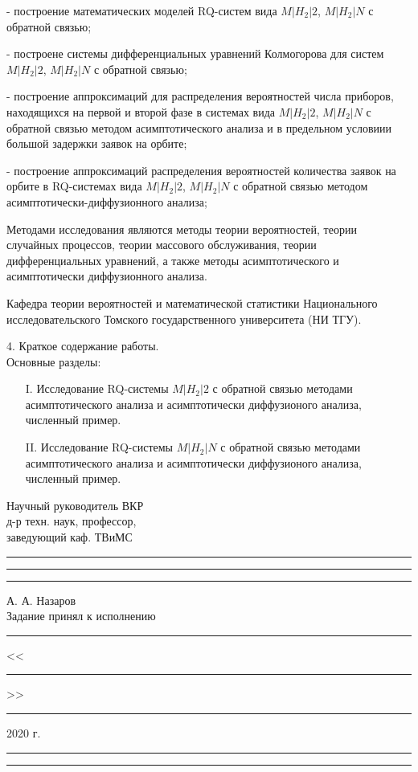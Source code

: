 - построение математических моделей RQ-систем вида $M|H_2|2$, $M|H_2|N$ с обратной связью;

- построене системы дифференциальных уравнений Колмогорова для систем $M|H_2|2$, $M|H_2|N$ с обратной связью;

- построение аппроксимаций для распределения вероятностей числа приборов, находящихся на первой и второй фазе в системах вида $M|H_2|2$, $M|H_2|N$ с обратной связью методом асимптотического анализа и в предельном условиии большой задержки заявок на орбите;

- построение аппроксимаций распределения вероятностей количества заявок на орбите в RQ-системах вида $M|H_2|2$, $M|H_2|N$ с обратной связью методом асимптотически-диффузионного анализа;

Методами исследования являются методы теории вероятностей, теории случайных процессов, теории массового обслуживания, теории дифференциальных уравнений, а также методы асимптотического и асимптотически диффузионного анализа.

Кафедра теории вероятностей и математической статистики Национального исследовательского Томского государственного университета (НИ ТГУ).

4. Краткое содержание работы.\\
Основные разделы:
\begin{itemize}
	\item[I.] Исследование RQ-системы $M|H_2|2$ с обратной связью методами асимптотического анализа и асимптотически диффузионого анализа, численный пример.
	\item[II.] Исследование RQ-системы $M|H_2|N$ с обратной связью методами асимптотического анализа и асимптотически диффузионого анализа, численный пример.
\end{itemize}


\noindent Научный руководитель ВКР\\
\noindent д-р техн. наук, профессор,\\
\noindent заведующий каф. ТВиМС\rule{30mm}{0pt}\rule{30mm}{0.4pt}\rule{30mm}{0pt} А. А. Назаров\\

\noindent Задание принял к исполнению\rule{10mm}{0pt}<<\rule{10mm}{0.4pt}>>\rule{25mm}{0.4pt} 2020 г.\rule{10mm}{0pt}\rule{23mm}{0.4pt}\\

